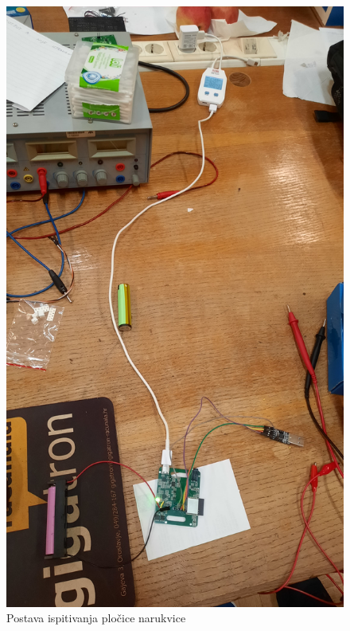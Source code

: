 \begin{figure}[htb]
    \centering
    \includegraphics[width=10 cm]{Figures/BR_TEST_02.jpg}
    \caption{Postava ispitivanja pločice narukvice}
    \label{slk:BR_TEST_01}
\end{figure}
